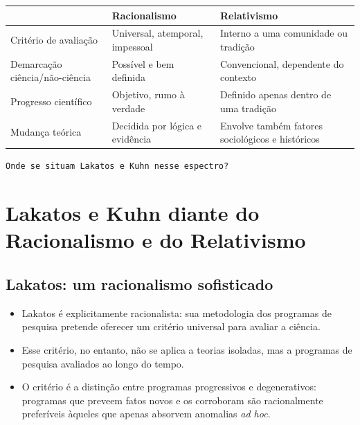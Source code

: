 \documentclass[9pt,a4paper]{extarticle}
\newcommand{\impt}[1]{\textcolor{important}{#1}}
\newcommand{\ntc}[1]{\textcolor{notice}{#1}}
\begin{document}
\begin{center}
\begin{tabularx}{\linewidth}{@{} l X X @{}}
\toprule
 & \textbf{Racionalismo} & \textbf{Relativismo} \\
\midrule
Critério de avaliação & Universal, atemporal, impessoal & Interno a uma comunidade ou tradição \\
Demarcação ciência/não-ciência & Possível e bem definida & Convencional, dependente do contexto \\
Progresso científico & Objetivo, rumo à verdade & Definido apenas dentro de uma tradição \\
Mudança teórica & Decidida por lógica e evidência & Envolve também fatores sociológicos e históricos \\
\bottomrule
\end{tabularx}
\end{center}

\texttt{Onde se situam Lakatos e Kuhn nesse espectro?}

\section{Lakatos e Kuhn diante do Racionalismo e do Relativismo}

\subsection{Lakatos: um racionalismo sofisticado}

\begin{itemize}
    \item Lakatos é \impt{explicitamente racionalista}: sua metodologia dos programas de pesquisa pretende oferecer um critério universal para avaliar a ciência.
    \item Esse critério, no entanto, \ntc{não se aplica a teorias isoladas}, mas a programas de pesquisa avaliados ao longo do tempo.
    \item O critério é a distinção entre programas \impt{progressivos} e \impt{degenerativos}: programas que preveem fatos novos e os corroboram são racionalmente preferíveis àqueles que apenas absorvem anomalias \textit{ad hoc}.
\end{itemize}
\end{document}

